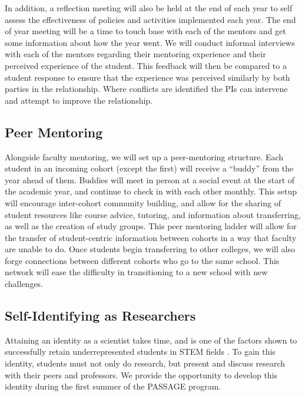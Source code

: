\documentclass[12pt]{article}
\begin{document}
In addition, a reflection meeting will also be held at the end of each year to self assess the effectiveness of policies and activities implemented each year.  The end of year meeting will be a time to touch base with each of the mentors and get some information about how the year went.  We will conduct informal interviews with each of the mentors regarding their mentoring experience and their perceived experience of the student.  This feedback will then be compared to a student response to ensure that the experience was perceived similarly by both parties in the relationship.  Where conflicts are identified the PIs can intervene and attempt to improve the relationship.
\vspace{-5mm}

\subsection{\normalsize{Peer Mentoring}}
\vspace{-2mm}

Alongside faculty mentoring, we will set up a peer-mentoring structure.  Each student in an incoming cohort (except the first) will receive a ``buddy'' from the year ahead of them.  Buddies will meet in person at a social event at the start of the academic year, and continue to check in with each other monthly.  This setup will encourage inter-cohort community building, and allow for the sharing of student resources like course advice, tutoring, and information about transferring, as well as the creation of study groups. This peer mentoring ladder will allow for the transfer of student-centric information between cohorts in a way that faculty are unable to do.   Once students begin transferring to other colleges, we will also forge connections between different cohorts who go to the same school.  This network will ease the difficulty in transitioning to a new school with new challenges.  
\vspace{-5mm}

\subsection{\normalsize{Self-Identifying as Researchers}}
\vspace{-2mm}

Attaining an identity as a scientist takes time, and is one of the factors shown to successfully retain underrepresented students in STEM fields \citep{Hurtado09,Johnson11,Rodriguez}.  To gain this identity, students must not only do research, but present and discuss research with their peers and professors.   We provide the opportunity to develop this identity during the first summer of the PASSAGE program.  
\end{document}
